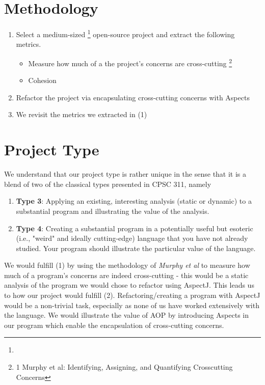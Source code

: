 \documentclass[sigconf]{acmart}
\begin{document}
\section{Methodology}
\begin{enumerate}
    \item Select a medium-sized \footnote{ } open-source project and extract the following metrics.
    \begin{itemize}
    \item Measure how much of a the project's concerns are cross-cutting \footnote{1 Murphy et al: Identifying, Assigning, and Quantifying Crosscutting Concerns}
    \item Cohesion
\end{itemize}
    \item Refactor the project via encapsulating cross-cutting concerns with Aspects
    \item We revisit the metrics we extracted in (1)
\end{enumerate}

\section{Project Type}
We understand that our project type is rather unique in the sense that it is a blend of two of the classical types presented in CPSC 311, namely
\begin{enumerate}
    \item \textbf{Type 3}: Applying an existing, interesting analysis (static or dynamic) to a substantial program and illustrating the value of the analysis.
    \item \textbf{Type 4}: Creating a substantial program in a potentially useful but esoteric (i.e., "weird" and ideally cutting-edge) language that you have not already studied. Your program should illustrate the particular value of the language.
\end{enumerate}
We would fulfill (1) by using the methodology of \textit{Murphy et al} to measure how much of a program's concerns are indeed cross-cutting - this would be a static analysis of the program we would chose to refactor using AspectJ. This leads us to how our project would fulfill (2). Refactoring/creating a program with AspectJ would be a non-trivial task, especially as none of us have worked extensively with the language. We would illustrate the value of AOP by introducing Aspects in our program which enable the encapsulation of cross-cutting concerns.
\end{document}
